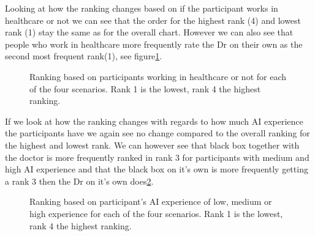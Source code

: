 \documentclass[manuscript,screen,review]{acmart}
\begin{document}
Looking at how the ranking changes based on if the participant works in healthcare or not we can see that the order for the highest rank (4) and lowest rank (1) stay the same as for the overall chart. However we can also see that people who work in healthcare more frequently rate the Dr on their own as the second most frequent rank(1), see figure\ref{fig:ranking-healthcare}.

\begin{figure}[H]
    \caption{Ranking based on participants working in healthcare or not for each of the four scenarios. Rank 1 is the lowest, rank 4 the highest ranking.}
    \label{fig:ranking-healthcare}
\end{figure}

If we look at how the ranking changes with regards to how much AI experience the participants have we again see no change compared to the overall ranking for the highest and lowest rank. We can however see that black box together with the doctor is more frequently ranked in rank 3 for participants with medium and high AI experience and that the black box on it's own is more frequently getting a rank 3 then the Dr on it's own does\ref{fig:ranking-ai}.

\begin{figure}[H]
    \caption{Ranking based on participant's AI experience of low, medium or high experience for each of the four scenarios. Rank 1 is the lowest, rank 4 the highest ranking.}
    \label{fig:ranking-ai}
\end{figure}
\end{document}
